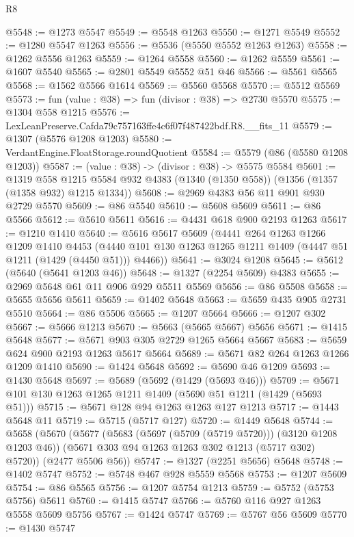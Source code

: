 \begin{lexlean}{R8}
\begin{coremodule}
@5548 := @1273 @5547
@5549 := @5548 @1263
@5550 := @1271 @5549
@5552 := @1280 @5547 @1263
@5556 := @5536 (@5550 @5552 @1263 @1263)
@5558 := @1262 @5556 @1263
@5559 := @1264 @5558
@5560 := @1262 @5559
@5561 := @1607 @5540
@5565 := @2801 @5549 @5552 @51 @46
@5566 := @5561 @5565
@5568 := @1562 @5566 @1614
@5569 := @5560 @5568
@5570 := @5512 @5569
@5573 := fun (value : @38) => fun (divisor : @38) => @2730 @5570
@5575 := @1304 @558 @1215
@5576 := LexLeanPreserve.Cafda79c757163ffe4c6f07f487422bdf.R8.__fits_11
@5579 := @1307 (@5576 @1208 @1203)
@5580 := VerdantEngine.FloatStorage.roundQuotient
@5584 := @5579 (@86 (@5580 @1208 @1203))
@5587 := (value : @38) -> (divisor : @38) -> @5575 @5584
@5601 := @1319
    @558
    @1215
    @5584
    @932
    @4383
    (@1340 (@1350 @558))
    (@1356 (@1357 (@1358 @932) @1215 @1334))
@5608 := @2969 @4383 @56 @11 @901 @930 @2729 @5570
@5609 := @86 @5540
@5610 := @5608 @5609
@5611 := @86 @5566
@5612 := @5610 @5611
@5616 := @4431 @618 @900 @2193 @1263
@5617 := @1210 @1410
@5640 := @5616
    @5617
    @5609
    (@4441
      @264
      @1263
      @1266
      @1209
      @1410
      @4453
      (@4440 @101 @130 @1263 @1265 @1211 @1409 (@4447 @51 @1211 (@1429 (@4450 @51))) @4466))
@5641 := @3024 @1208
@5645 := @5612 (@5640 (@5641 @1203 @46))
@5648 := @1327 (@2254 @5609) @4383
@5655 := @2969 @5648 @61 @11 @906 @929 @5511 @5569
@5656 := @86 @5508
@5658 := @5655 @5656 @5611
@5659 := @1402 @5648
@5663 := @5659 @435 @905 @2731 @5510
@5664 := @86 @5506
@5665 := @1207 @5664
@5666 := @1207 @302
@5667 := @5666 @1213
@5670 := @5663 (@5665 @5667) @5656
@5671 := @1415 @5648
@5677 := @5671 @903 @305 @2729 @1265 @5664 @5667
@5683 := @5659 @624 @900 @2193 @1263 @5617 @5664
@5689 := @5671 @82 @264 @1263 @1266 @1209 @1410
@5690 := @1424 @5648
@5692 := @5690 @46 @1209
@5693 := @1430 @5648
@5697 := @5689 (@5692 (@1429 (@5693 @46)))
@5709 := @5671 @101 @130 @1263 @1265 @1211 @1409 (@5690 @51 @1211 (@1429 (@5693 @51)))
@5715 := @5671 @128 @94 @1263 @1263 @127 @1213
@5717 := @1443 @5648 @11
@5719 := @5715 (@5717 @127)
@5720 := @1449 @5648
@5744 := @5658
    (@5670
      (@5677
        (@5683 (@5697 (@5709 (@5719 @5720))) (@3120 @1208 @1203 @46))
        (@5671 @303 @94 @1263 @1263 @302 @1213 (@5717 @302) @5720))
      (@2477 @5506 @56))
@5747 := @1327 (@2251 @5656) @5648
@5748 := @1402 @5747
@5752 := @5748 @467 @928 @5559 @5568
@5753 := @1207 @5609
@5754 := @86 @5565
@5756 := @1207 @5754 @1213
@5759 := @5752 (@5753 @5756) @5611
@5760 := @1415 @5747
@5766 := @5760 @116 @927 @1263 @5558 @5609 @5756
@5767 := @1424 @5747
@5769 := @5767 @56 @5609
@5770 := @1430 @5747

\end{coremodule}
\end{lexlean}
